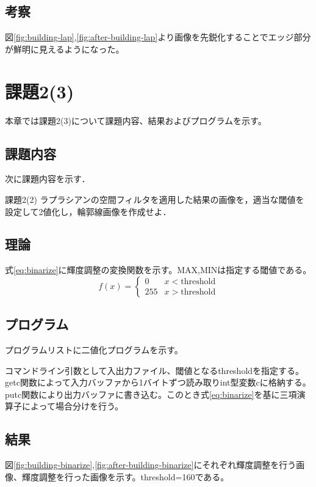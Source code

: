 \documentclass[11pt,a4paper,titlepage,dvipdfmx]{jarticle}
\begin{document}
  \subsection{考察}
    図\ref{fig:building-lap},\ref{fig:after-building-lap}より画像を先鋭化することでエッジ部分が鮮明に見えるようになった。

\section{課題2(3)}
  本章では課題2(3)について課題内容、結果およびプログラムを示す。
  \subsection{課題内容}
    次に課題内容を示す．
    \begin{itembox}[l]{課題2(2)}
      ラプラシアンの空間フィルタを適用した結果の画像を，適当な閾値を設定して2値化し，輪郭線画像を作成せよ．
    \end{itembox}
  \subsection{理論}
    式\eqref{eq:binarize}に輝度調整の変換関数を示す。MAX,MINは指定する閾値である。
    \begin{equation} \label{eq:binarize}
      f(x) = 
      \begin{cases}
      0   &   x < \text{threshold}  \\
      255        &  x > \text{threshold} 
      \end{cases}
    \end{equation} 
  \subsection{プログラム}
    プログラムリストに二値化プログラムを示す。
    
    コマンドライン引数として入出力ファイル、閾値となるthresholdを指定する。getc関数によって入力バッファから1バイトずつ読み取りint型変数cに格納する。
    putc関数により出力バッファに書き込む。このとき式\eqref{eq:binarize}を基に三項演算子によって場合分けを行う。
  \subsection{結果}
    図\ref{fig:building-binarize},\ref{fig:after-building-binarize}にそれぞれ輝度調整を行う画像、輝度調整を行った画像を示す。threshold=160である。
\end{document}
